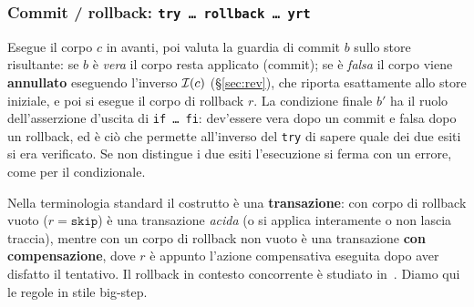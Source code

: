 \subsubsection{Commit / rollback: \texttt{try\,\dots\,rollback\,\dots\,yrt}}
\label{sec:try}
Esegue il corpo $c$ in avanti, poi valuta la guardia di commit $b$ sullo store
risultante: se $b$ è \emph{vera} il corpo resta applicato (commit); se è
\emph{falsa} il corpo viene \textbf{annullato} eseguendo l'inverso $\mathcal{I}(c)$
(\S\ref{sec:rev}), che riporta esattamente allo store iniziale, e poi si esegue
il corpo di rollback $r$. La condizione finale $b'$ ha il ruolo
dell'asserzione d'uscita di \texttt{if\,\dots\,fi}: dev'essere vera dopo un
commit e falsa dopo un rollback, ed è ciò che permette all'inverso del
\texttt{try} di sapere quale dei due esiti si era verificato. Se non distingue
i due esiti l'esecuzione si ferma con un errore, come per il condizionale.

\medskip
\noindent
Nella terminologia standard il costrutto è una \textbf{transazione}: con corpo
di rollback vuoto ($r = \mathtt{skip}$) è una transazione \emph{acida} (o si
applica interamente o non lascia traccia), mentre con un corpo di rollback non
vuoto è una transazione \textbf{con compensazione}, dove $r$ è appunto
l'azione compensativa eseguita dopo aver disfatto il tentativo. Il rollback in
contesto concorrente è studiato in~\cite{LaneseMezzinaSchmittStefani2011,
LaneseLienhardtMezzinaSchmittStefani2013}. Diamo qui le regole in stile
big-step.

